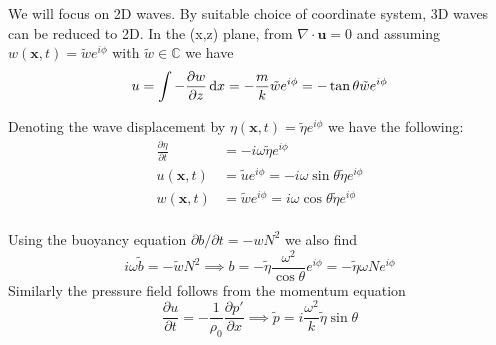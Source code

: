 \documentclass{jknotes}
\begin{document}
We will focus on 2D waves. By suitable choice of coordinate system, 3D waves
can be reduced to 2D. In the (x,z) plane, from $\nabla \cdot \symbf{u} = 0$
and assuming $w(\symbf{x},t) = \tilde{w}e^{i\phi}$ with $\tilde{w} \in
\mathbb{C}$ we have
\begin{equation}
	u = \int -\frac{\partial w}{\partial z} \, \diffd x = -\frac{m}{k}
	\tilde{w}e^{i\phi} = - \tan \theta \tilde{w} e^{i\phi}
\end{equation}
\begin{center}
\end{center}
Denoting the wave displacement by $\eta(\symbf{x},t) = \tilde{\eta}e^{i\phi}$
we have the following:
\begin{align}
	\frac{\partial \eta}{\partial t} &= -i\omega \tilde{\eta} e^{i\phi} \\
	u(\symbf{x},t) &= \tilde{u}e^{i\phi} = -i\omega \sin\theta
	\tilde{\eta}e^{i\phi} \\
	w(\symbf{x},t) &= \tilde{w}e^{i\phi} = i\omega \cos\theta
	\tilde{\eta}e^{i\phi} \\
\end{align}

Using the buoyancy equation $\partial b / \partial t = - w N^2$ we also find
\begin{equation}
	i\omega \tilde{b} = - \tilde{w}N^2 \implies b = - \tilde{\eta}
	\frac{\omega^2}{\cos\theta} e^{i\phi} = - \tilde{\eta}\omega N e^{i\phi}
\end{equation}
Similarly the pressure field follows from the momentum equation
\begin{equation}
	\frac{\partial u}{\partial t} = - \frac{1}{\rho_0} \frac{\partial
	p'}{\partial x} \implies \tilde{p} = i\frac{\omega^2}{k}
	\tilde{\eta}\sin\theta
\end{equation}
\end{document}
